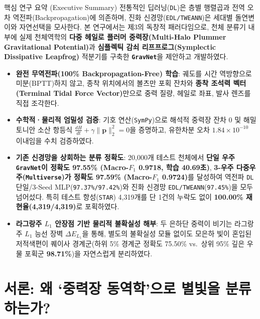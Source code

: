 \documentclass[11pt,a4paper]{article}
\begin{document}
\begin{physicsbox}{핵심 연구 요약 (Executive Summary)}
전통적인 딥러닝(\texttt{DL})은 층별 행렬곱과 전역 오차 역전파(Backpropagation)에 의존하며, 진화 신경망(\texttt{EDL/TWEANN})은 세대별 돌연변이와 자연선택을 모사한다. 본 연구에서는 제3의 독창적 패러다임으로, 천체 분류기 내부에 실제 천체역학의 \textbf{다중 헤일로 플러머 중력장(Multi-Halo Plummer Gravitational Potential)}과 \textbf{심플렉틱 감쇠 리프프로그(Symplectic Dissipative Leapfrog)} 적분기를 구축한 \textbf{\texttt{GravNet}}을 제안하고 개발하였다.
\begin{itemize}[leftmargin=16pt, itemsep=2pt, topsep=3pt]
  \item \textbf{완전 무역전파(100\% Backpropagation-Free) 학습}: 궤도를 시간 역방향으로 미분(BPTT)하지 않고, 종착 위치에서의 볼츠만 포획 잔차와 \textbf{종착 조석력 벡터(Terminal Tidal Force Vector)}만으로 중력 질량, 헤일로 좌표, 발사 렌즈를 직접 조각한다.
  \item \textbf{수학적·물리적 엄밀성 검증}: 기호 연산(\texttt{SymPy})으로 해석적 중력장 잔차 $0$ 및 해밀토니안 소산 항등식 $\frac{dH}{dt} + \gamma\|\mathbf{p}\|_2^2 = 0$을 증명하고, 유한차분 오차 $1.84 \times 10^{-10}$ 이내임을 수치 검증하였다.
  \item \textbf{기존 신경망을 상회하는 분류 정확도}: 20,000개 테스트 천체에서 \textbf{단일 우주 \texttt{GravNet}이 정확도 97.55\% (Macro-$F_1$ 0.9718, 학습 40.69초)}, \textbf{3-우주 다중우주(\texttt{Multiverse})가 정확도 97.59\% (Macro-$F_1$ 0.9724)}를 달성하여 역전파 \texttt{DL} 단일/3-Seed MLP(\texttt{97.37\%/97.42\%})와 진화 신경망 \texttt{EDL/TWEANN}(\texttt{97.45\%})을 모두 넘어섰다. 특히 테스트 항성(\texttt{STAR}) 4,319개를 단 1건의 누락도 없이 \textbf{100.00\% 재현율(4,319/4,319)}로 포획하였다.
  \item \textbf{라그랑주 $L_1$ 안장점 기반 물리적 불확실성 해부}: 두 은하단 중력이 비기는 라그랑주 $L_1$ 능선 장벽 $\Delta E_{L_1}$을 통해, 별도의 불확실성 모듈 없이도 모은하 빛이 혼입된 저적색편이 퀘이사 경계군(하위 5\% 경계군 정확도 75.50\% vs.\ 상위 95\% 깊은 우물 포획군 \textbf{98.71\%})을 자연스럽게 분리하였다.
\end{itemize}
\end{physicsbox}

\section{서론: 왜 `중력장 동역학'으로 별빛을 분류하는가?}
\end{document}
